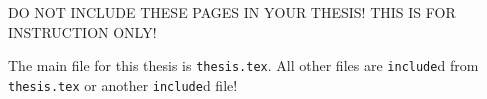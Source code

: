 




    \begin{center}
	DO NOT INCLUDE THESE PAGES IN YOUR THESIS! THIS IS FOR
	INSTRUCTION ONLY! 
    \end{center}
    \small
    The main file for this thesis is \verb|thesis.tex|.  All other
    files are \verb|include|d from \verb|thesis.tex| or another
    \verb|include|d file!
	
